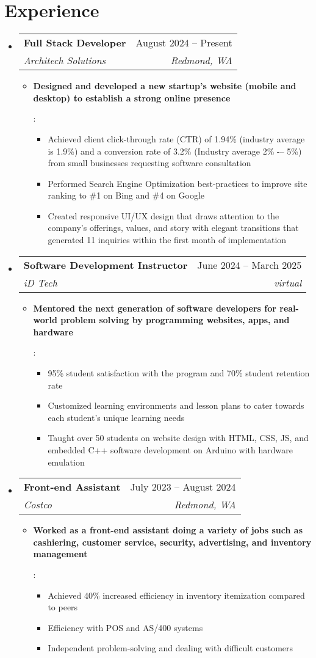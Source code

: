 \documentclass[letterpaper,11pt]{article}
\makeatletter
\newcommand{\resumeItem}[2]{
  \item\small{
    \textbf{#1}{: #2 \vspace{-2pt}}
  }
}
\newcommand{\resumeSubheading}[4]{
  \vspace{-1pt}\item
    \begin{tabular*}{0.97\textwidth}[t]{l@{\extracolsep{\fill}}r}
      \textbf{#1} & #2 \\
      \textit{\small#3} & \textit{\small #4} \\
    \end{tabular*}\vspace{-5pt}
}
\newcommand{\resumeSubHeadingListStart}{\begin{itemize}[leftmargin=*]}
\newcommand{\resumeSubHeadingListEnd}{\end{itemize}}
\newcommand{\resumeItemListStart}{\begin{itemize}}
\newcommand{\resumeItemListEnd}{\end{itemize}\vspace{-5pt}}
\makeatother
\begin{document}
\section{Experience}
    \resumeSubHeadingListStart
        \resumeSubheading
            {Full Stack Developer}{August 2024 -- Present}
            {Architech Solutions}{Redmond, WA}
            \resumeItemListStart
                \resumeItem{Designed and developed a new startup’s website (mobile and desktop) to establish a strong online presence}
                {
                    \begin{itemize}
                    \item Achieved client click-through rate (CTR) of 1.94\% (industry average is 1.9\%) and a conversion rate of 3.2\% (Industry average 2\% -– 5\%) from small businesses requesting software consultation
                    \item Performed Search Engine Optimization best-practices to improve site ranking to \#1 on Bing and \#4 on Google
                    \item Created responsive UI/UX design that draws attention to the company’s offerings, values, and story with elegant transitions that generated 11 inquiries within the first month of implementation
                    \end{itemize}
                }
            \resumeItemListEnd
    \resumeSubheading
        {Software Development Instructor}{June 2024 -- March 2025}
        {iD Tech}{virtual}
        \resumeItemListStart
        \resumeItem{Mentored the next generation of software developers for real-world problem solving by programming websites, apps, and hardware}
        {
            \begin{itemize}
            \item 95\% student satisfaction with the program and 70\% student retention rate 
            \item Customized learning environments and lesson plans to cater towards each student’s unique learning needs
            \item Taught over 50 students on website design with HTML, CSS, JS, and embedded C++ software development on Arduino with hardware emulation 
            \end{itemize}
        }
        \resumeItemListEnd
        \resumeSubheading
            {Front-end Assistant}{July 2023 -- August 2024}
            {Costco}{Redmond, WA}
            \resumeItemListStart
                \resumeItem{Worked as a front-end assistant doing a variety of jobs such as cashiering, customer service, security, advertising, and inventory management}
                {
                    \begin{itemize}
                    \item Achieved 40\% increased efficiency in inventory itemization compared to peers
                    \item Efficiency with POS and AS/400 systems
                    \item Independent problem-solving and dealing with difficult customers
                    \end{itemize}
                }
            \resumeItemListEnd
        \resumeSubHeadingListEnd
\end{document}
